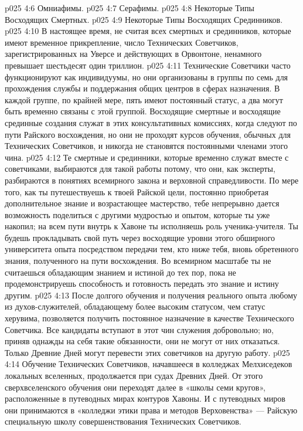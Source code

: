 \vs p025 4:6 \bibnobreakspace Омниафимы.
\vs p025 4:7 \bibnobreakspace Серафимы.
\vs p025 4:8 \bibnobreakspace Некоторые Типы Восходящих Смертных.
\vs p025 4:9 \bibnobreakspace Некоторые Типы Восходящих Срединников.
\vs p025 4:10 \pc В настоящее время, не считая всех смертных и срединников, которые имеют временное прикрепление, число Технических Советчиков, зарегистрированных на Уверсе и действующих в Орвонтоне, ненамного превышает шестьдесят один триллион.
\vs p025 4:11 Технические Советчики часто функционируют как индивидуумы, но они организованы в группы по семь для прохождения службы и поддержания общих центров в сферах назначения. В каждой группе, по крайней мере, пять имеют постоянный статус, а два могут быть временно связаны с этой группой. Восходящие смертные и восходящие срединные создания служат в этих консультативных комиссиях, когда следуют по пути Райского восхождения, но они не проходят курсов обучения, обычных для Технических Советчиков, и никогда не становятся постоянными членами этого чина.
\vs p025 4:12 Те смертные и срединники, которые временно служат вместе с советчиками, выбираются для такой работы потому, что они, как эксперты, разбираются в понятиях всемирного закона и верховной справедливости. По мере того, как ты путешествуешь к твоей Райской цели, постоянно приобретая дополнительное знание и возрастающее мастерство, тебе непрерывно дается возможность поделиться с другими мудростью и опытом, которые ты уже накопил; на всем пути внутрь к Хавоне ты исполняешь роль ученика\hyp{}учителя. Ты будешь прокладывать свой путь через восходящие уровни этого обширного университета опыта посредством передачи тем, кто ниже тебя, вновь обретенного знания, полученного на пути восхождения. Во всемирном масштабе ты не считаешься обладающим знанием и истиной до тех пор, пока не продемонстрируешь способность и готовность передать это знание и истину другим.
\vs p025 4:13 После долгого обучения и получения реального опыта любому из духов\hyp{}служителей, обладающему более высоким статусом, чем статус херувима, позволяется получить постоянное назначение в качестве Технического Советчика. Все кандидаты вступают в этот чин служения добровольно; но, приняв однажды на себя такие обязанности, они не могут от них отказаться. Только Древние Дней могут перевести этих советчиков на другую работу.
\vs p025 4:14 \pc Обучение Технических Советчиков, начавшееся в колледжах Мелхиседеков локальных вселенных, продолжается при судах Древних Дней. От этого сверхвселенского обучения они переходят далее в «школы семи кругов», расположенные в путеводных мирах контуров Хавоны. И с путеводных миров они принимаются в «колледжи этики права и методов Верховенства» --- Райскую специальную школу совершенствования Технических Советчиков.
